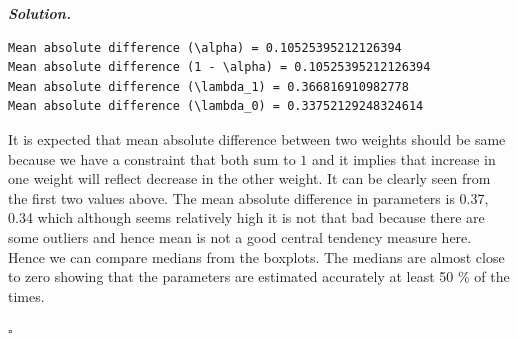 \documentclass[12pt]{article}
\newenvironment{solution}[1][\it{Solution}]{\textbf{#1. } }{$\square$}
\begin{document}
\begin{solution}
\begin{lstlisting}
Mean absolute difference (\alpha) = 0.10525395212126394
Mean absolute difference (1 - \alpha) = 0.10525395212126394
Mean absolute difference (\lambda_1) = 0.366816910982778
Mean absolute difference (\lambda_0) = 0.33752129248324614
\end{lstlisting}

It is expected that mean absolute difference between two weights should be same because we have a constraint that both sum to $1$ and it implies that increase in one weight will reflect decrease in the other weight. It can be clearly seen from the first two values above. The mean absolute difference in parameters is 0.37, 0.34 which although seems relatively high it is not that bad because there are some outliers and hence mean is not a good central tendency measure here. Hence we can compare medians from the boxplots. The medians are almost close to zero showing that the parameters are estimated accurately at least 50 \% of the times.

\end{solution}
\end{document}
